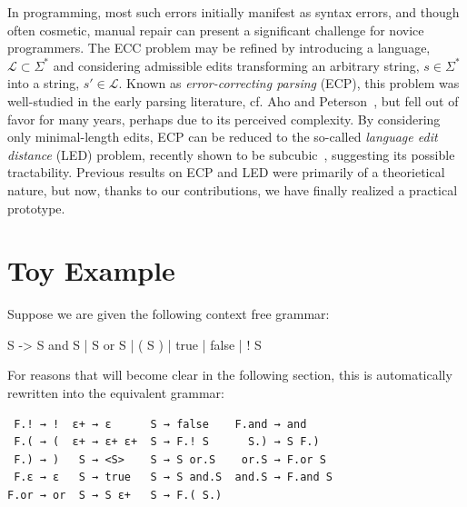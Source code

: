 \documentclass[sigplan,nonacm]{acmart}\settopmatter{printfolios=false,printccs=false,printacmref=false}
\begin{document}
In programming, most such errors initially manifest as syntax errors, and though often cosmetic, manual repair can present a significant challenge for novice programmers. The ECC problem may be refined by introducing a language, $\mathcal{L} \subset \Sigma^*$ and considering admissible edits transforming an arbitrary string, $s \in \Sigma^*$ into a string, $s'\in\mathcal{L}$. Known as \textit{error-correcting parsing} (ECP), this problem was well-studied in the early parsing literature, cf. Aho and Peterson~\cite{aho1972minimum}, but fell out of favor for many years, perhaps due to its perceived complexity. By considering only minimal-length edits, ECP can be reduced to the so-called \textit{language edit distance} (LED) problem, recently shown to be subcubic~\cite{bringmann2019truly}, suggesting its possible tractability. Previous results on ECP and LED were primarily of a theorietical nature, but now, thanks to our contributions, we have finally realized a practical prototype.

%

\section{Toy Example}

Suppose we are given the following context free grammar:

\begin{tidyinput}
S -> S and S | S or S | ( S ) | true | false | ! S
\end{tidyinput}

\noindent For reasons that will become clear in the following section, this is automatically rewritten into the equivalent grammar:

\begin{verbatim}
 F.! → !  ε+ → ε      S → false    F.and → and
 F.( → (  ε+ → ε+ ε+  S → F.! S      S.) → S F.)
 F.) → )   S → <S>    S → S or.S    or.S → F.or S
 F.ε → ε   S → true   S → S and.S  and.S → F.and S
F.or → or  S → S ε+   S → F.( S.)
\end{verbatim}

%
\end{document}
